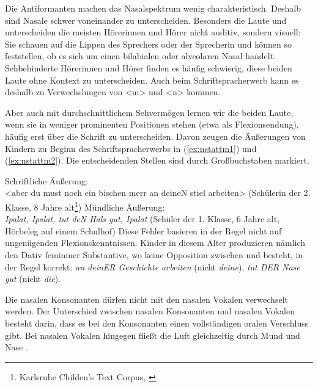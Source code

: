 Die Antiformanten machen das Nasalspektrum wenig charakteristisch. Deshalb sind Nasale schwer voneinander zu unterscheiden. Besonders die Laute \textipa{[m]} und \textipa{[n]} unterscheiden die meisten Hörerinnen und Hörer nicht auditiv, sondern visuell: Sie schauen auf die Lippen des Sprechers oder der Sprecherin und können so feststellen, ob es sich um einen bilabialen oder alveolaren Nasal handelt. Sehbehinderte Hörerinnen und Hörer finden es häufig schwierig, diese beiden Laute ohne Kontext zu unterscheiden. Auch beim Schriftspracherwerb kann es deshalb zu Verwechslungen von <m> und <n> kommen.

Aber auch mit durchschnittlichem Sehvermögen lernen wir die beiden Laute, wenn sie in weniger prominenten Positionen stehen (etwa als Flexionsendung), häufig erst über die Schrift zu unterscheiden. Davon zeugen die Äußerungen von Kindern zu Beginn des Schriftspracherwerbs in (\ref{ex:nstattm1}) und (\ref{ex:nstattm2}). Die entscheidenden Stellen sind durch Großbuchstaben markiert.

\ea
\ea \label{ex:nstattm1} Schriftliche Äußerung:\\ <aber du must noch ein bischen merr an deineN stiel arbeiten> (Schülerin der 2. Klasse, 8 Jahre alt\footnote{Karlsruhe Childen's Text Corpus, \citet{Lavalleyetal2015}})
\ex \label{ex:nstattm2} Mündliche Äußerung:\\ \textit{Ipalat, Ipalat, tut deN Hals gut, Ipalat} (Schüler der 1. Klasse, 6 Jahre alt, Hörbeleg auf einem Schulhof)
\z
\z
Diese Fehler basieren in der Regel nicht auf ungenügenden Flexionskenntnissen. Kinder in diesem Alter produzieren nämlich den Dativ femininer Substantive, wo keine Opposition zwischen \textipa{[n]} und \textipa{[m]} besteht, in der Regel korrekt: \textit{an deinER Geschichte arbeiten} (nicht \textit{deine}), \textit{tut DER Nase gut} (nicht \textit{die}).

Die nasalen Konsonanten dürfen nicht mit den nasalen Vokalen verwechselt werden. Der Unterschied zwischen nasalen Konsonanten und nasalen Vokalen besteht darin, dass es bei den Konsonanten einen vollständigen oralen Verschluss gibt. Bei nasalen Vokalen hingegen fließt die Luft gleichzeitig durch Mund und Nase \citep[163--166]{Johnson:2003}.


